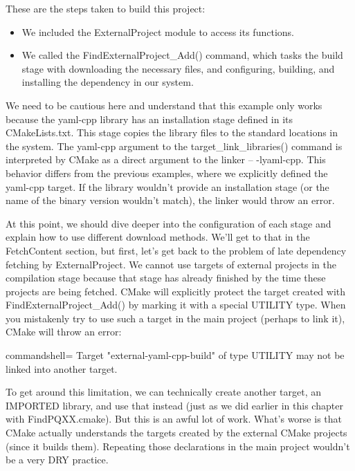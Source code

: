 These are the steps taken to build this project:

\begin{itemize}
\item 
We included the ExternalProject module to access its functions.

\item 
We called the FindExternalProject\_Add() command, which tasks the build stage with downloading the necessary files, and configuring, building, and installing the dependency in our system.
\end{itemize}

We need to be cautious here and understand that this example only works because the yaml-cpp library has an installation stage defined in its CMakeLists.txt. This stage copies the library files to the standard locations in the system. The yaml-cpp argument to the target\_link\_libraries() command is interpreted by CMake as a direct argument to the linker – -lyaml-cpp. This behavior differs from the previous examples, where we explicitly defined the yaml-cpp target. If the library wouldn't provide an installation stage (or the name of the binary version wouldn't match), the linker would throw an error.

At this point, we should dive deeper into the configuration of each stage and explain how to use different download methods. We'll get to that in the FetchContent section, but first, let's get back to the problem of late dependency fetching by ExternalProject. We cannot use targets of external projects in the compilation stage because that stage has already finished by the time these projects are being fetched. CMake will explicitly protect the target created with FindExternalProject\_Add() by marking it with a special UTILITY type. When you mistakenly try to use such a target in the main project (perhaps to link it), CMake will throw an error:

\begin{tcblisting}{commandshell={}}
Target "external-yaml-cpp-build" of type UTILITY may not be
linked into another target.
\end{tcblisting}

To get around this limitation, we can technically create another target, an IMPORTED library, and use that instead (just as we did earlier in this chapter with FindPQXX.cmake). But this is an awful lot of work. What's worse is that CMake actually understands the targets created by the external CMake projects (since it builds them). Repeating those declarations in the main project wouldn't be a very DRY practice.

